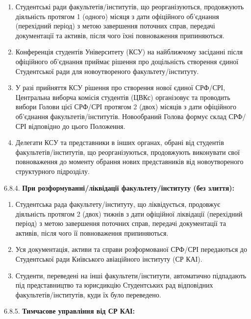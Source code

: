         \begin{enumerate}[label=\alph*)]
            \item Студентські ради факультетів/інститутів, що реорганізуються, продовжують діяльність протягом 1 (одного) місяця з дати офіційного об'єднання (перехідний період) з метою завершення поточних справ, передачі документації та активів, після чого їхні повноваження припиняються.
            \item Конференція студентів Університету (КСУ) на найближчому засіданні після офіційного об'єднання приймає рішення про доцільність створення єдиної Студентської ради для новоутвореного факультету/інституту.
            \item У разі прийняття КСУ рішення про створення нової єдиної СРФ/СРІ, Центральна виборча комісія студентів (ЦВКс) організовує та проводить вибори Голови цієї СРФ/СРІ протягом 2 (двох) місяців з дати офіційного об'єднання факультетів/інститутів. Новообраний Голова формує склад СРФ/СРІ відповідно до цього Положення.
            \item Делегати КСУ та представники в інших органах, обрані від студентів факультетів/інститутів, що реорганізуються, продовжують виконувати свої повноваження до моменту обрання нових представників від новоутвореного структурного підрозділу.
        \end{enumerate}

    6.8.4. \textbf{При розформуванні/ліквідації факультету/інституту (без злиття):}

        \begin{enumerate}[label=\alph*)]
            \item Студентська рада факультету/інституту, що ліквідується, продовжує діяльність протягом 2 (двох) тижнів з дати офіційної ліквідації (перехідний період) з метою завершення поточних справ, передачі документації та активів, після чого її повноваження припиняються.
            \item Уся документація, активи та справи розформованої СРФ/СРІ передаються до Студентської ради Київського авіаційного інституту (СР КАІ).
            \item Студенти, переведені на інші факультети/інститути, автоматично підпадають під представництво та юрисдикцію Студентських рад відповідних факультетів/інститутів, куди їх було переведено.
        \end{enumerate}

    6.8.5. \textbf{Тимчасове управління від СР КАІ:}


